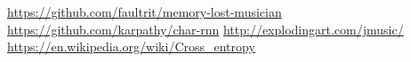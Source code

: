 \documentclass{article}
\begin{document}
\begin{thebibliography}{}
 \url{https://github.com/faultrit/memory-lost-musician}
 \url{https://github.com/karpathy/char-rnn}
 \url{http://explodingart.com/jmusic/}
 \url{https://en.wikipedia.org/wiki/Cross_entropy}
\end{thebibliography}
\end{document}
